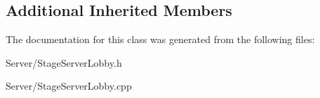 \subsection*{Additional Inherited Members}


The documentation for this class was generated from the following files\-:\begin{DoxyCompactItemize}
\item 
Server/Stage\-Server\-Lobby.\-h\item 
Server/Stage\-Server\-Lobby.\-cpp\end{DoxyCompactItemize}
